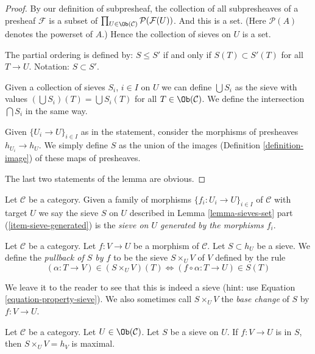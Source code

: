 \begin{proof}
By our definition of subpresheaf, the collection of
all subpresheaves of a presheaf $\mathcal{F}$ is a subset of
$\prod_{U \in \Ob(\mathcal{C})} \mathcal{P}(\mathcal{F}(U))$.
And this is a set. (Here $\mathcal{P}(A)$ denotes
the powerset of $A$.) Hence the collection of sieves on $U$
is a set.

\medskip\noindent
The partial ordering is defined by: $S \leq S'$ if and only if
$S(T) \subset S'(T)$ for all $T \to U$. Notation: $S \subset S'$.

\medskip\noindent
Given a collection of sieves $S_i$, $i \in I$ on $U$ we can
define $\bigcup S_i$ as the sieve with values
$(\bigcup S_i)(T) = \bigcup S_i(T)$ for all
$T \in \Ob(\mathcal{C})$.
We define the intersection $\bigcap S_i$ in the same way.

\medskip\noindent
Given $\{U_i \to U\}_{i\in I}$ as in the statement, consider
the morphisms of presheaves $h_{U_i} \to h_U$. We simply
define $S$ as the union of the images (Definition \ref{definition-image})
of these maps of presheaves.

\medskip\noindent
The last two statements of the lemma are obvious.
\end{proof}

\begin{definition}
\label{definition-sieve-generated}
Let $\mathcal{C}$ be a category.
Given a family of morphisms $\{f_i : U_i \to U\}_{i\in I}$
of $\mathcal{C}$ with target $U$ we say the sieve
$S$ on $U$ described in Lemma \ref{lemma-sieves-set}
part (\ref{item-sieve-generated}) is the {\it sieve  on $U$
generated by the morphisms $f_i$}.
\end{definition}

\begin{definition}
\label{definition-pullback-sieve}
Let $\mathcal{C}$ be a category.
Let $f : V \to U$ be a morphism of $\mathcal{C}$.
Let $S \subset h_U$ be a sieve. We define the
{\it pullback of $S$ by $f$} to be the sieve
$S \times_U V$ of $V$ defined by the rule
$$
(\alpha : T \to V) \in (S \times_U V)(T)
\Leftrightarrow
(f \circ \alpha : T \to U) \in S(T)
$$
\end{definition}

\noindent
We leave it to the reader to see that this is indeed a sieve
(hint: use Equation \ref{equation-property-sieve}).
We also sometimes call $S \times_U V$ the {\it base change}
of $S$ by $f : V \to U$.

\begin{lemma}
\label{lemma-pullback-sieve-section}
Let $\mathcal{C}$ be a category.
Let $U \in \Ob(\mathcal{C})$.
Let $S$ be a sieve on $U$.
If $f : V \to U$ is in $S$, then
$S \times_U V = h_V$ is maximal.
\end{lemma}


